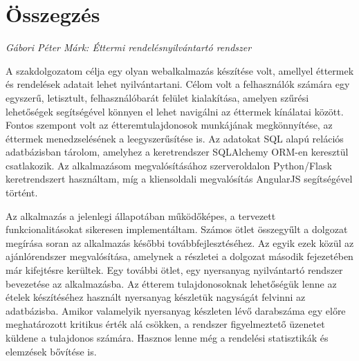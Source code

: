 \documentclass[a4paper,12pt]{article}
\begin{document}
\pagestyle{empty}

\section*{Összegzés}

\textit{Gábori Péter Márk: Éttermi rendelésnyilvántartó rendszer}

\bigskip

A szakdolgozatom célja egy olyan webalkalmazás készítése volt, amellyel éttermek és rendelések adatait lehet nyilvántartani. Célom volt a felhasználók számára egy egyszerű, letisztult, felhasználóbarát felület kialakítása, amelyen szűrési lehetőségek segítségével könnyen el lehet navigálni az éttermek kínálatai között. Fontos szempont volt az étteremtulajdonosok munkájának megkönnyítése, az éttermek menedzselésének a leegyszerűsítése is. Az adatokat SQL alapú relációs adatbázisban tárolom, amelyhez a keretrendszer SQLAlchemy ORM-en keresztül csatlakozik. Az alkalmazásom megvalósításához szerveroldalon Python/Flask keretrendszert használtam, míg a kliensoldali megvalósítás AngularJS segítségével történt.

Az alkalmazás a jelenlegi állapotában működőképes, a tervezett funkcionalitásokat sikeresen implementáltam. Számos ötlet összegyűlt a dolgozat megírása soran az alkalmazás későbbi továbbfejlesztéséhez. Az egyik ezek közül az ajánlórendszer megvalósítása, amelynek a részletei a dolgozat második fejezetében már kifejtésre kerültek. Egy további ötlet, egy nyersanyag nyilvántartó rendszer bevezetése az alkalmazásba. Az étterem tulajdonosoknak lehetőségük lenne az ételek készítéséhez használt nyersanyag készletük nagyságát felvinni az adatbázisba. Amikor valamelyik nyersanyag készleten lévő darabszáma egy előre meghatározott kritikus érték alá csökken, a rendszer figyelmeztető üzenetet küldene a tulajdonos számára. Hasznos lenne még a rendelési statisztikák és elemzések bővítése is.
\end{document}
